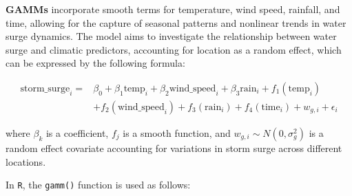 \documentclass[
  letterpaper,
  DIV=11,
  numbers=noendperiod]{scrartcl}
\newenvironment{Shaded}{\begin{snugshade}}{\end{snugshade}}
\newcommand{\AttributeTok}[1]{\textcolor[rgb]{0.40,0.45,0.13}{#1}}
\newcommand{\CommentTok}[1]{\textcolor[rgb]{0.37,0.37,0.37}{#1}}
\newcommand{\DecValTok}[1]{\textcolor[rgb]{0.68,0.00,0.00}{#1}}
\newcommand{\FunctionTok}[1]{\textcolor[rgb]{0.28,0.35,0.67}{#1}}
\newcommand{\NormalTok}[1]{\textcolor[rgb]{0.00,0.23,0.31}{#1}}
\newcommand{\OtherTok}[1]{\textcolor[rgb]{0.00,0.23,0.31}{#1}}
\newcommand{\SpecialCharTok}[1]{\textcolor[rgb]{0.37,0.37,0.37}{#1}}
\newcommand{\StringTok}[1]{\textcolor[rgb]{0.13,0.47,0.30}{#1}}
\begin{document}
\textbf{GAMMs} incorporate smooth terms for temperature, wind speed,
rainfall, and time, allowing for the capture of seasonal patterns and
nonlinear trends in water surge dynamics. The model aims to investigate
the relationship between water surge and climatic predictors, accounting
for location as a random effect, which can be expressed by the following
formula:

\begin{align*}
\text{storm\_surge}_i=&\beta_0+\beta_1\text{temp}_i+\beta_2\text{wind\_speed}_i+\beta_3\text{rain}_i+f_1(\text{temp}_i)\\&+f_2(\text{wind\_speed}_i)+f_3(\text{rain}_i)+f_4(\text{time}_i)+w_{g,i}+\epsilon_i
\end{align*}

where \(\beta_k\) is a coefficient, \(f_j\) is a smooth function, and
\(w_{g,i}\sim N(0, \sigma^2_g)\) is a random effect covariate accounting
for variations in storm surge across different locations.

In \texttt{R}, the \texttt{gamm()} function is used as follows:

\begin{Shaded}
\end{Shaded}
\end{document}
